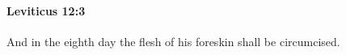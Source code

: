 
		\paragraph{Leviticus 12:3} %
			\label{LEVITICUS-12-3}

			And in the eighth day the flesh of his foreskin shall be circumcised.


